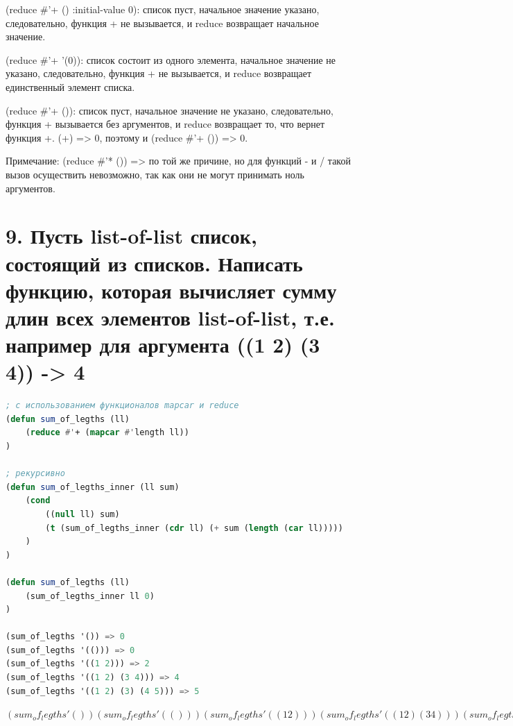 \documentclass[12pt]{report}
\begin{document}
(reduce \#'+ () :initial-value 0): список пуст, начальное значение указано, следовательно, функция + не вызывается, и reduce возвращает начальное значение.

(reduce \#'+ '(0)): список состоит из одного элемента, начальное значение не указано, следовательно, функция + не вызывается, и reduce возвращает единственный элемент списка.

(reduce \#'+ ()): список пуст, начальное значение не указано, следовательно, функция + вызывается без аргументов, и reduce возвращает то, что вернет функция +. (+) => 0, поэтому и (reduce \#'+ ()) => 0.

Примечание: (reduce \#'* ()) => по той же причине, но для функций - и / такой вызов осуществить невозможно, так как они не могут принимать ноль аргументов.

\clearpage
\section*{9. Пусть list-of-list список, состоящий из списков. Написать функцию, которая вычисляет сумму длин всех элементов list-of-list, т.е. например для аргумента ((1 2) (3 4)) -> 4}


\begin{lstlisting}[language=Lisp]
; с использованием функционалов mapcar и reduce 
(defun sum_of_legths (ll) 
	(reduce #'+ (mapcar #'length ll))
)

; рекурсивно
(defun sum_of_legths_inner (ll sum) 
	(cond 
		((null ll) sum)
		(t (sum_of_legths_inner (cdr ll) (+ sum (length (car ll)))))
	)
)

(defun sum_of_legths (ll) 
	(sum_of_legths_inner ll 0)
)

(sum_of_legths '()) => 0
(sum_of_legths '(())) => 0
(sum_of_legths '((1 2))) => 2
(sum_of_legths '((1 2) (3 4))) => 4
(sum_of_legths '((1 2) (3) (4 5))) => 5
\end{lstlisting}

$
(sum_of_legths '())
(sum_of_legths '(()))
(sum_of_legths '((1 2)))
(sum_of_legths '((1 2) (3 4)))
(sum_of_legths '((1 2) (3) (4 5)))
$
\fi

	

	
\end{document}
